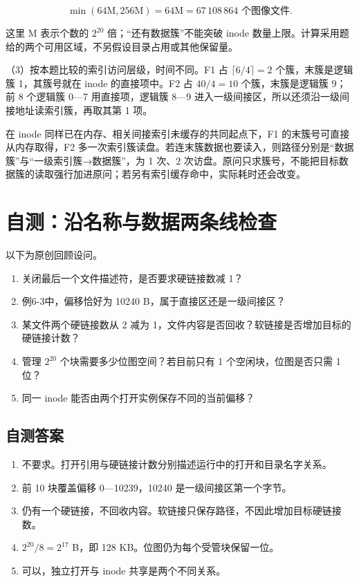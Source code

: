 \[\min(64\mathrm{M},256\mathrm{M})=64\mathrm{M}=67\,108\,864\text{ 个图像文件}.\]

这里 M 表示个数的 \(2^{20}\) 倍；``还有数据簇''不能突破 inode 数量上限。计算采用题给的两个可用区域，不另假设目录占用或其他保留量。

（3）按本题比较的索引访问层级，时间不同。F1 占 \(\lceil6/4\rceil=2\) 个簇，末簇是逻辑簇 1，其簇号就在 inode 的直接项中。F2 占 \(40/4=10\) 个簇，末簇是逻辑簇 9；前 8 个逻辑簇 0---7 用直接项，逻辑簇 8---9 进入一级间接区，所以还须沿一级间接地址读索引簇，再取其第 1 项。

在 inode 同样已在内存、相关间接索引未缓存的共同起点下，F1 的末簇号可直接从内存取得，F2 多一次索引簇读盘。若连末簇数据也要读入，则路径分别是``数据簇''与``一级索引簇→数据簇''，为 1 次、2 次访盘。原问只求簇号，不能把目标数据簇的读取强行加进原问；若另有索引缓存命中，实际耗时还会改变。

\section{自测：沿名称与数据两条线检查}\label{os-6-review}

以下为原创回顾设问。

\begin{enumerate}
\def\labelenumi{\arabic{enumi}.}
\tightlist
\item
  关闭最后一个文件描述符，是否要求硬链接数减 1？
\item
  例6-3中，偏移恰好为 10240 B，属于直接区还是一级间接区？
\item
  某文件两个硬链接数从 2 减为 1，文件内容是否回收？软链接是否增加目标的硬链接计数？
\item
  管理 \(2^{20}\) 个块需要多少位图空间？若目前只有 1 个空闲块，位图是否只需 1 位？
\item
  同一 inode 能否由两个打开实例保存不同的当前偏移？
\end{enumerate}

\subsection{自测答案}\label{os-c06-h253}

\begin{enumerate}
\def\labelenumi{\arabic{enumi}.}
\tightlist
\item
  不要求。打开引用与硬链接计数分别描述运行中的打开和目录名字关系。
\item
  前 10 块覆盖偏移 0---10239，10240 是一级间接区第一个字节。
\item
  仍有一个硬链接，不回收内容。软链接只保存路径，不因此增加目标硬链接数。
\item
  \(2^{20}/8=2^{17}\) B，即 128 KB。位图仍为每个受管块保留一位。
\item
  可以，独立打开与 inode 共享是两个不同关系。
\end{enumerate}

